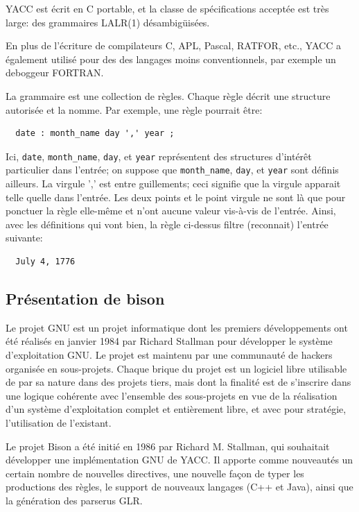 \documentclass[a4paper,11pt,twoside,final]{article}
\begin{document}
  YACC est écrit en C portable, et la classe de spécifications acceptée est
  très large: des grammaires LALR(1) désambigüisées.

  En plus de l'écriture de compilateurs C, APL, Pascal, RATFOR, etc., YACC a
  également utilisé pour des des langages moins conventionnels, par exemple un
  deboggeur FORTRAN.

  La grammaire est une collection de règles. Chaque règle décrit une structure
  autorisée et la nomme. Par exemple, une règle pourrait être:

  \begin{verbatim}
  date : month_name day ',' year ;
  \end{verbatim}

  Ici, \texttt{date}, \texttt{month\_name}, \texttt{day}, et \texttt{year}
  représentent des structures d'intérêt particulier dans l'entrée; on suppose
  que \texttt{month\_name}, \texttt{day}, et \texttt{year} sont définis
  ailleurs. La virgule ',' est entre guillements; ceci signifie que la virgule
  apparait telle quelle dans l'entrée. Les deux points et le point virgule
  ne sont là que pour ponctuer la règle elle-même et n'ont aucune valeur
  vis-à-vis de l'entrée. Ainsi, avec les définitions qui vont bien, la règle
  ci-dessus filtre (reconnait) l'entrée suivante:

  \begin{verbatim}
  July 4, 1776
  \end{verbatim}

  \subsection{Présentation de bison}

  Le projet GNU est un projet informatique dont les premiers développements ont
  été réalisés en janvier 1984 par Richard Stallman pour développer le système
  d'exploitation GNU\@. Le projet est maintenu par une communauté de hackers
  organisée en sous-projets. Chaque brique du projet est un logiciel libre
  utilisable de par sa nature dans des projets tiers, mais dont la finalité est
  de s'inscrire dans une logique cohérente avec l'ensemble des sous-projets en
  vue de la réalisation d'un système d’exploitation complet et entièrement
  libre, et avec pour stratégie, l'utilisation de l'existant.

  Le projet Bison a été initié en 1986 par Richard M. Stallman, qui souhaitait
  développer une implémentation GNU de YACC\@. Il apporte comme nouveautés un
  certain nombre de nouvelles directives, une nouvelle façon de typer les
  productions des règles, le support de nouveaux langages (C++ et Java), ainsi
  que la génération des parserus GLR.
\end{document}
